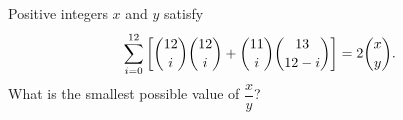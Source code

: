 Positive integers $x$ and $y$ satisfy
\[
\sum_{i=0}^{12}\left[\dbinom{12}{i}\dbinom{12}{i}+\dbinom{11}{i}\dbinom{13}{12-i}\right]=2\dbinom{x}{y}.
\]
What is the smallest possible value of $\dfrac {x}{y}$?
